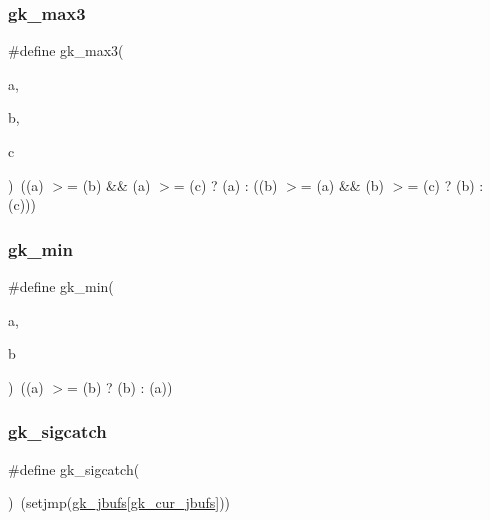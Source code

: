 \subsubsection{\texorpdfstring{gk\+\_\+max3}{gk\_max3}}
{\footnotesize\ttfamily \#define gk\+\_\+max3(\begin{DoxyParamCaption}\item[{}]{a,  }\item[{}]{b,  }\item[{}]{c }\end{DoxyParamCaption})~((a) $>$= (b) \&\& (a) $>$= (c) ? (a) \+: ((b) $>$= (a) \&\& (b) $>$= (c) ? (b) \+: (c)))}

\mbox{\label{a00053_ae94627fa347c3b7d3f49bccbd01db40a}} 
\subsubsection{\texorpdfstring{gk\+\_\+min}{gk\_min}}
{\footnotesize\ttfamily \#define gk\+\_\+min(\begin{DoxyParamCaption}\item[{}]{a,  }\item[{}]{b }\end{DoxyParamCaption})~((a) $>$= (b) ? (b) \+: (a))}

\mbox{\label{a00053_a59a6c75b539b1e491180612cc74063c1}} 
\subsubsection{\texorpdfstring{gk\+\_\+sigcatch}{gk\_sigcatch}}
{\footnotesize\ttfamily \#define gk\+\_\+sigcatch(\begin{DoxyParamCaption}{ }\end{DoxyParamCaption})~(setjmp(\hyperlink{a00047_ab371a33f6ef660f6c8192c47a5acb5f0}{gk\+\_\+jbufs}\mbox{[}\hyperlink{a00047_a4977ceba83d44d803185a470184ce54c}{gk\+\_\+cur\+\_\+jbufs}\mbox{]}))}

\mbox{\label{a00053_a8fd4c35dbcc4dce28ea11c88ea326f2c}} 
